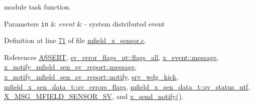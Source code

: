 module task function. 


\begin{DoxyParams}[1]{Parameters}
\mbox{\tt in}  & {\em event} & -\/ system distributed event \\
\hline
\end{DoxyParams}


Definition at line \hyperlink{a00050_source_l00071}{71} of file \hyperlink{a00050_source}{mfield\+\_\+x\+\_\+sensor.\+c}.



References \hyperlink{a00072_source_l00059}{A\+S\+S\+E\+R\+T}, \hyperlink{a00022_source_l00044}{sv\+\_\+error\+\_\+flags\+\_\+ut\+::flags\+\_\+all}, \hyperlink{a00036_source_l00064}{x\+\_\+event\+::message}, \hyperlink{a00019_a946af134546e64739ccfd37633480dc2}{x\+\_\+notify\+\_\+mfield\+\_\+sen\+\_\+sv\+\_\+report\+::message}, \hyperlink{a00019_source_l00090}{x\+\_\+notify\+\_\+mfield\+\_\+sen\+\_\+sv\+\_\+report\+::notify}, \hyperlink{a00067_source_l00028}{srv\+\_\+wdg\+\_\+kick}, \hyperlink{a00025_source_l00051}{mfield\+\_\+x\+\_\+sen\+\_\+data\+\_\+t\+::sv\+\_\+errors\+\_\+flags}, \hyperlink{a00025_source_l00026}{mfield\+\_\+x\+\_\+sen\+\_\+data\+\_\+t\+::sv\+\_\+status\+\_\+ntf}, \hyperlink{a00025_source_l00012}{X\+\_\+\+M\+S\+G\+\_\+\+M\+F\+I\+E\+L\+D\+\_\+\+S\+E\+N\+S\+O\+R\+\_\+\+S\+V}, and \hyperlink{a00037_source_l00435}{x\+\_\+send\+\_\+notify()}.


